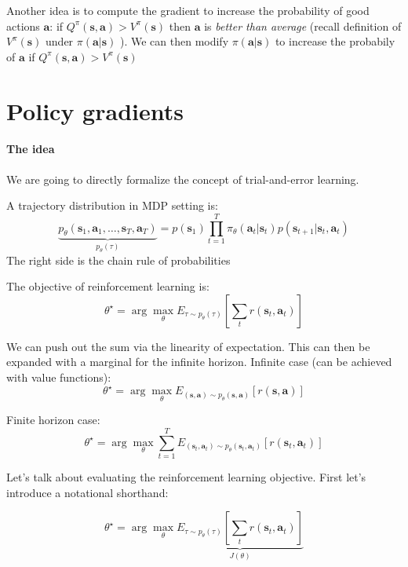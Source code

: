 \documentclass{report}
\newcommand{\argmax}{\arg\!\max}
\begin{document}
Another idea is to compute the gradient to increase the probability of good actions $\bm{a}$:
if $ Q^\pi(\bm{s}, \bm{a}) > V^\pi(\bm{s})$ then $\bm{a}$ is \textit{better than average} (recall definition of $V^\pi(\bm{s})$ under $\pi(\bm{a}|\bm{s}) $  ).
We can then modify $\pi(\bm{a}|\bm{s})$ to increase the probabily of $\bm{a}$ if $ Q^\pi(\bm{s}, \bm{a}) > V^\pi(\bm{s})$


\section{Policy gradients}
\paragraph{The idea} We are going to directly formalize the concept of trial-and-error learning.


 A trajectory distribution in MDP setting is:
 \begin{equation}
 		\underbrace{p_\theta(\bm{s}_1, \bm{a}_1, \dots, \bm{s}_T, \bm{a}_T)}_{p_\theta(\tau)} = p(\bm{s}_1) \prod^{T}_{t=1} \pi_{\theta} (\bm{a}_t | \bm{s}_t) p (\bm{s}_{t+1} | \bm{s}_t, \bm{a}_t)
 \end{equation}
The right side is the chain rule of probabilities

The objective of reinforcement learning is:
\begin{equation}
		\theta^\star = \argmax_\theta E_{\tau \sim p_\theta (\tau)} \left [ \sum_t r(\bm{s}_t, \bm{a}_t) \right ]
\end{equation}

We can push out the sum via the linearity of expectation.
This can then be expanded with a marginal for the infinite horizon.
Infinite case (can be achieved with value functions):
\begin{equation}		
		\theta^\star = \argmax_\theta E_{(\bm{s}, \bm{a}) \sim p_\theta (\bm{s}, \bm{a})} \left [r(\bm{s}, \bm{a}) \right]
\end{equation}

Finite horizon case:
\begin{equation}		
		\theta^\star = \argmax_\theta \sum^{T}_{t=1}  E_{(\bm{s}_t, \bm{a}_t) \sim p_\theta (\bm{s}_t, \bm{a}_t)} \left [ r(\bm{s}_t, \bm{a}_t) \right]
\end{equation}


Let's talk about evaluating the reinforcement learning objective.
First let's introduce a notational shorthand:

\begin{equation}
		\theta^\star = \argmax_\theta \underbrace{E_{\tau \sim p_\theta (\tau)} \left [ \sum_t r(\bm{s}_t, \bm{a}_t) \right ]}_{J(\theta)}
\end{equation}
\end{document}
